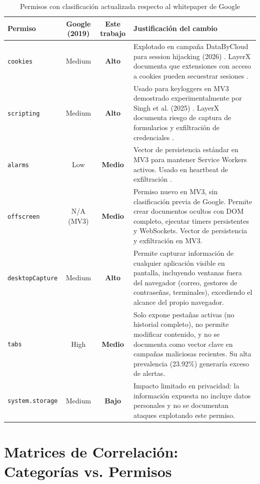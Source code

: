 \documentclass[12pt,oneside]{report}
\begin{document}
\begin{table}[H]
\centering
\small
\begin{tabular}{|l|c|c|p{6cm}|}
\hline
\textbf{Permiso} & \textbf{Google (2019)} & \textbf{Este trabajo} & \textbf{Justificación del cambio} \\
\hline
\texttt{cookies} & Medium & \textbf{Alto} & Explotado en campaña DataByCloud para session hijacking (2026) \cite{pandya2026databycloud}. LayerX documenta que extensiones con acceso a cookies pueden secuestrar sesiones \cite{layerx2025report}. \\
\hline
\texttt{scripting} & Medium & \textbf{Alto} & Usado para keyloggers en MV3 demostrado experimentalmente por Singh et al. (2025) \cite{singh2025study}. LayerX documenta riesgo de captura de formularios y exfiltración de credenciales \cite{layerx2025report}. \\
\hline
\texttt{alarms} & Low & \textbf{Medio} & Vector de persistencia estándar en MV3 para mantener Service Workers activos. Usado en heartbeat de exfiltración \cite{socket2025phantom}. \\
\hline
\texttt{offscreen} & N/A (MV3) & \textbf{Medio} & Permiso nuevo en MV3, sin clasificación previa de Google. Permite crear documentos ocultos con DOM completo, ejecutar timers persistentes y WebSockets. Vector de persistencia y exfiltración en MV3. \\
\hline
\texttt{desktopCapture} & Medium & \textbf{Alto} & Permite capturar información de cualquier aplicación visible en pantalla, incluyendo ventanas fuera del navegador (correo, gestores de contraseñas, terminales), excediendo el alcance del propio navegador. \\
\hline
\texttt{tabs} & High & \textbf{Medio} & Solo expone pestañas activas (no historial completo), no permite modificar contenido, y no se documenta como vector clave en campañas maliciosas recientes. Su alta prevalencia (23.92\%) generaría exceso de alertas. \\
\hline
\texttt{system.storage} & Medium & \textbf{Bajo} & Impacto limitado en privacidad: la información expuesta no incluye datos personales y no se documentan ataques explotando este permiso. \\
\hline
\end{tabular}
\caption{Permisos con clasificación actualizada respecto al whitepaper de Google}
\label{tab:permission_diff}
\end{table}


\section{Matrices de Correlación: Categorías vs. Permisos}
\end{document}
